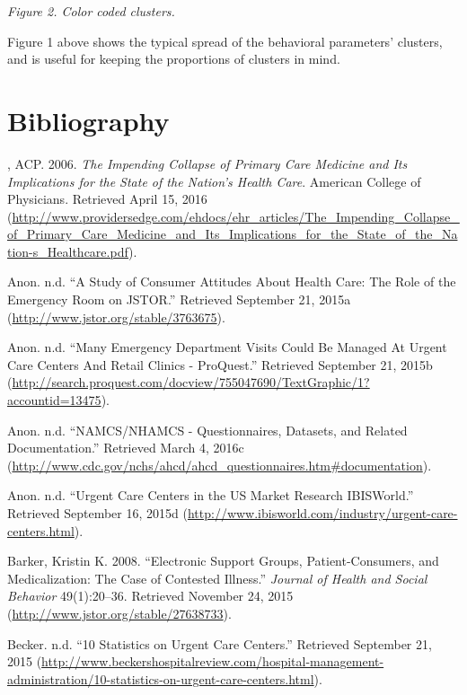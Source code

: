 \documentclass[12pt,twoside]{reedthesis}
\begin{document}
  \emph{Figure 2. Color coded clusters.}
  
  Figure 1 above shows the typical spread of the behavioral parameters'
  clusters, and is useful for keeping the proportions of clusters in mind.
  
  \backmatter
  
  \chapter*{Bibliography}\label{bibliography}
  
  \noindent
  \setlength{\parindent}{-0.20in} \setlength{\leftskip}{0.20in}
  \setlength{\parskip}{8pt}
  
  , ACP. 2006. \emph{The Impending Collapse of Primary Care Medicine and
  Its Implications for the State of the Nation's Health Care}. American
  College of Physicians. Retrieved April 15, 2016
  (\url{http://www.providersedge.com/ehdocs/ehr_articles/The_Impending_Collapse_of_Primary_Care_Medicine_and_Its_Implications_for_the_State_of_the_Nation-s_Healthcare.pdf}).
  
  Anon. n.d. ``A Study of Consumer Attitudes About Health Care: The Role
  of the Emergency Room on JSTOR.'' Retrieved September 21, 2015a
  (\url{http://www.jstor.org/stable/3763675}).
  
  Anon. n.d. ``Many Emergency Department Visits Could Be Managed At Urgent
  Care Centers And Retail Clinics - ProQuest.'' Retrieved September 21,
  2015b
  (\url{http://search.proquest.com/docview/755047690/TextGraphic/1?accountid=13475}).
  
  Anon. n.d. ``NAMCS/NHAMCS - Questionnaires, Datasets, and Related
  Documentation.'' Retrieved March 4, 2016c
  (\url{http://www.cdc.gov/nchs/ahcd/ahcd_questionnaires.htm\#documentation}).
  
  Anon. n.d. ``Urgent Care Centers in the US Market Research IBISWorld.''
  Retrieved September 16, 2015d
  (\url{http://www.ibisworld.com/industry/urgent-care-centers.html}).
  
  Barker, Kristin K. 2008. ``Electronic Support Groups, Patient-Consumers,
  and Medicalization: The Case of Contested Illness.'' \emph{Journal of
  Health and Social Behavior} 49(1):20--36. Retrieved November 24, 2015
  (\url{http://www.jstor.org/stable/27638733}).
  
  Becker. n.d. ``10 Statistics on Urgent Care Centers.'' Retrieved
  September 21, 2015
  (\url{http://www.beckershospitalreview.com/hospital-management-administration/10-statistics-on-urgent-care-centers.html}).
  
\end{document}

